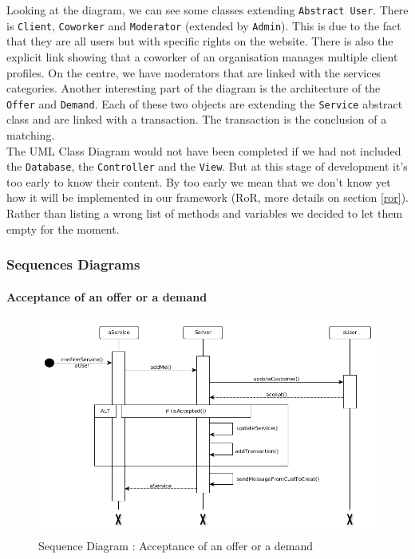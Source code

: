 Looking at the diagram, we can see some classes extending \texttt{Abstract User}. There is \texttt{Client}, \texttt{Coworker} and \texttt{Moderator} (extended by \texttt{Admin}). This is due to the fact that they are all users but with specific rights on the website. There is also the explicit link showing that a coworker of an organisation manages multiple client profiles. On the centre, we have moderators that are linked with the services categories. Another interesting part of the diagram is the architecture of the \texttt{Offer} and \texttt{Demand}. Each of these two objects are extending the \texttt{Service} abstract class and are linked with a transaction. The transaction is the conclusion of a matching.\\

The UML Class Diagram would not have been completed if we had not included the \texttt{Database}, the \texttt{Controller} and the \texttt{View}. But at this stage of development it's too early to know their content. By too early we mean that we don't know yet how it will be implemented in our framework (RoR, more details on section \vref{ror}). Rather than listing a wrong list of methods and variables we decided to let them empty for the moment.


\subsubsection{Sequences Diagrams} %

\paragraph{Acceptance of an offer or a demand}

\begin{figure}[H]
	\begin{center}
		\includegraphics[width=.9\textwidth]{seq_acceptService.png}
		\caption{Sequence Diagram : Acceptance of an offer or a demand}
		\label{fig:acceptService}
	\end{center}
\end{figure}

